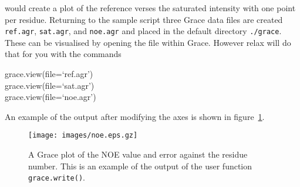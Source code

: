would create a plot of the reference verses the saturated intensity with one point per residue.  Returning to the sample script three Grace data files are created \texttt{ref.agr}, \texttt{sat.agr}, and \texttt{noe.agr} and placed in the default directory \texttt{./grace}.  These can be visualised by opening the file within Grace.  However relax will do that for you with the commands

\begin{exampleenv}
grace.view(file=`ref.agr') \\
grace.view(file=`sat.agr') \\
grace.view(file=`noe.agr')
\end{exampleenv}

An example of the output after modifying the axes is shown in figure~\ref{fig: NOE plot}.

\begin{figure}
\centerline{\texttt{[image: images/noe.eps.gz]}}
\caption[NOE plot]{A Grace plot of the NOE value and error against the residue number.  This is an example of the output of the user function \texttt{grace.write()}.}\label{fig: NOE plot}
\end{figure}
